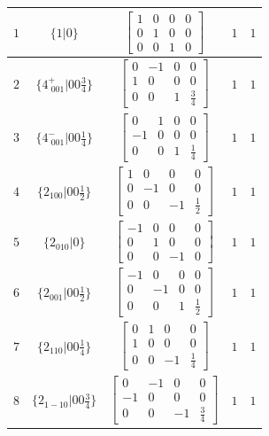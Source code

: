 \documentclass[fleqn,8pt]{jsarticle}
\begin{document}
\begin{longtable}{ccccc}
$ 1 $ & $ \{1|0\} $ & $ \begin{bmatrix} 1 & 0 & 0 & 0 \\ 0 & 1 & 0 & 0 \\ 0 & 0 & 1 & 0 \end{bmatrix} $ & $ 1 $ & $ 1 $ \\ \hline
$ 2 $ & $ \{4^{+}_{\,\,001}|0 0 \frac{3}{4}\} $ & $ \begin{bmatrix} 0 & -1 & 0 & 0 \\ 1 & 0 & 0 & 0 \\ 0 & 0 & 1 & \frac{3}{4} \end{bmatrix} $ & $ 1 $ & $ 1 $ \\ \hline
$ 3 $ & $ \{4^{-}_{\,\,001}|0 0 \frac{1}{4}\} $ & $ \begin{bmatrix} 0 & 1 & 0 & 0 \\ -1 & 0 & 0 & 0 \\ 0 & 0 & 1 & \frac{1}{4} \end{bmatrix} $ & $ 1 $ & $ 1 $ \\ \hline
$ 4 $ & $ \{2{}_{100}|0 0 \frac{1}{2}\} $ & $ \begin{bmatrix} 1 & 0 & 0 & 0 \\ 0 & -1 & 0 & 0 \\ 0 & 0 & -1 & \frac{1}{2} \end{bmatrix} $ & $ 1 $ & $ 1 $ \\ \hline
$ 5 $ & $ \{2{}_{010}|0\} $ & $ \begin{bmatrix} -1 & 0 & 0 & 0 \\ 0 & 1 & 0 & 0 \\ 0 & 0 & -1 & 0 \end{bmatrix} $ & $ 1 $ & $ 1 $ \\ \hline
$ 6 $ & $ \{2{}_{001}|0 0 \frac{1}{2}\} $ & $ \begin{bmatrix} -1 & 0 & 0 & 0 \\ 0 & -1 & 0 & 0 \\ 0 & 0 & 1 & \frac{1}{2} \end{bmatrix} $ & $ 1 $ & $ 1 $ \\ \hline
$ 7 $ & $ \{2{}_{110}|0 0 \frac{1}{4}\} $ & $ \begin{bmatrix} 0 & 1 & 0 & 0 \\ 1 & 0 & 0 & 0 \\ 0 & 0 & -1 & \frac{1}{4} \end{bmatrix} $ & $ 1 $ & $ 1 $ \\ \hline
$ 8 $ & $ \{2{}_{1-10}|0 0 \frac{3}{4}\} $ & $ \begin{bmatrix} 0 & -1 & 0 & 0 \\ -1 & 0 & 0 & 0 \\ 0 & 0 & -1 & \frac{3}{4} \end{bmatrix} $ & $ 1 $ & $ 1 $ \\
\end{longtable}
\end{document}
